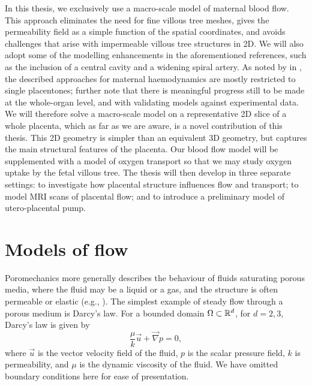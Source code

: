         In this thesis, we exclusively use a macro-scale model of maternal blood flow. This approach eliminates the need for fine villous tree meshes, gives the permeability field as a simple function of the spatial coordinates, and avoids challenges that arise with impermeable villous tree structures in 2D. We will also adopt some of the modelling enhancements in the aforementioned references, such as the inclusion of a central cavity and a widening spiral artery. As noted by \citeauthor{jensenBloodFlowTransport2019} in \cite{jensenBloodFlowTransport2019}, the described approaches for maternal haemodynamics are mostly restricted to single placentones; \citeauthor{jensenBloodFlowTransport2019} further note that there is meaningful progress still to be made at the whole-organ level, and with validating models against experimental data. We will therefore solve a macro-scale model on a representative 2D slice of a whole placenta, which as far as we are aware, is a novel contribution of this thesis. This 2D geometry is simpler than an equivalent 3D geometry, but captures the main structural features of the placenta. Our blood flow model will be supplemented with a model of oxygen transport so that we may study oxygen uptake by the fetal villous tree. The thesis will then develop in three separate settings: to investigate how placental structure influences flow and transport; to model MRI scans of placental flow; and to introduce a preliminary model of utero-placental pump.
        
    \section{Models of flow} 
        Poromechanics more generally describes the behaviour of fluids saturating porous media, where the fluid may be a liquid or a gas, and the structure is often permeable or elastic (e.g., \cite{collisEffectiveEquationsGoverning2017}). The simplest example of steady flow through a porous medium is Darcy's law. For a bounded domain $\Omega \subset \mathbb{R}^d$, for $d = 2, 3$, Darcy's law is given by
        \begin{equation}
            \frac{\mu}{k} \vec{u} + \vec{\nabla}p = 0,
            \label{eq:darcy-law}
        \end{equation}
        where $\vec{u}$ is the vector velocity field of the fluid, $p$ is the scalar pressure field, $k$ is permeability, and $\mu$ is the dynamic viscosity of the fluid. We have omitted boundary conditions here for ease of presentation.

